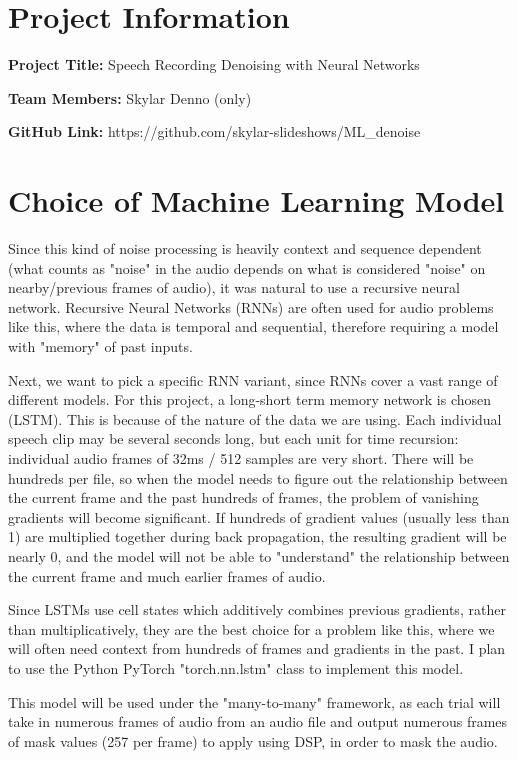 \documentclass[11pt, letterpaper]{article}
\begin{document}
\section{Project Information}

\noindent \textbf{Project Title:} Speech Recording Denoising with Neural Networks

\noindent\textbf{Team Members:} Skylar Denno (only)

\noindent\textbf{GitHub Link:} https://github.com/skylar-slideshows/ML\_denoise

\section{Choice of Machine Learning Model}

Since this kind of noise processing is heavily context and sequence dependent (what counts as "noise" in the audio depends on what is considered "noise" on nearby/previous frames of audio), it was natural to use a recursive neural network. Recursive Neural Networks (RNNs) are often used for audio problems like this, where the data is temporal and sequential, therefore requiring a model with "memory" of past inputs.

Next, we want to pick a specific RNN variant, since RNNs cover a vast range of different models. For this project, a long-short term memory network is chosen (LSTM). This is because of the nature of the data we are using. Each individual speech clip may be several seconds long, but each unit for time recursion: individual audio frames of 32ms / 512 samples are very short. There will be hundreds per file, so when the model needs to figure out the relationship between the current frame and the past hundreds of frames, the problem of vanishing gradients will become significant. If hundreds of gradient values (usually less than 1) are multiplied together during back propagation, the resulting gradient will be nearly 0, and the model will not be able to "understand" the relationship between the current frame and much earlier frames of audio.

Since LSTMs use cell states which additively combines previous gradients, rather than multiplicatively, they are the best choice for a problem like this, where we will often need context from hundreds of frames and gradients in the past. I plan to use the Python PyTorch "torch.nn.lstm" class to implement this model.

This model will be used under the "many-to-many" framework, as each trial will take in numerous frames of audio from an audio file and output numerous frames of mask values (257 per frame) to apply using DSP, in order to mask the audio.
\end{document}
